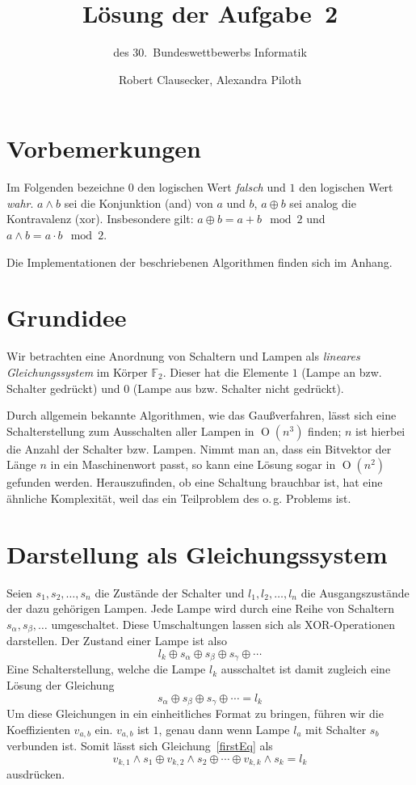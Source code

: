 \documentclass{scrartcl}
\title{Lösung der Aufgabe~2}
\subtitle{des 30.~Bundeswettbewerbs Informatik}
\author{Robert Clausecker, Alexandra Piloth}
\newcommand{\ftwo}{\ensuremath{\mathbb F_2}}
\DeclareMathOperator{\bigO}{O}
\newcommand{\xor}{\oplus}
\begin{document}
\maketitle

\section*{Vorbemerkungen}
Im Folgenden bezeichne $0$ den logischen Wert \emph{falsch} und $1$ den
logischen Wert \emph{wahr}. $a\land b$ sei die Konjunktion (and) von $a$
und $b$, $a\xor b$ sei analog die Kontravalenz (xor). Insbesondere gilt:
$a\xor b=a+b\mod 2$ und $a\land b=a\cdot b\mod 2$.

Die Implementationen der beschriebenen Algorithmen finden sich im Anhang.

\section{Grundidee}
Wir betrachten eine Anordnung von Schaltern und Lampen als \emph{lineares
Gleichungssystem} im Körper \ftwo.  Dieser hat die Elemente $1$ (Lampe an bzw.
Schalter gedrückt) und $0$ (Lampe aus bzw. Schalter nicht gedrückt).

Durch allgemein bekannte Algorithmen, wie das Gaußverfahren, lässt sich eine
Schalterstellung zum Ausschalten aller Lampen in $\bigO(n^3)$ finden; $n$ ist
hierbei die Anzahl der Schalter bzw. Lampen. Nimmt man an, dass ein Bitvektor
der Länge $n$ in ein Maschinenwort passt, so kann eine Lösung sogar in $\bigO(
n^2)$ gefunden werden. Herauszufinden, ob eine Schaltung brauchbar ist, hat eine
ähnliche Komplexität, weil das ein Teilproblem des o.\,g. Problems ist.

\section{Darstellung als Gleichungssystem}
Seien $s_1, s_2,\dots, s_n$ die Zustände der Schalter und $l_1, l_2,\dots,l_n$
die Ausgangszustände der dazu gehörigen Lampen. Jede Lampe wird durch eine Reihe
von Schaltern $s_\alpha, s_\beta,\dots$ umgeschaltet. Diese Umschaltungen lassen
sich als XOR-Operationen darstellen. Der Zustand einer Lampe ist also
\begin{equation}
l_k \xor s_\alpha \xor s_\beta \xor s_\gamma \xor \cdots
\end{equation}
Eine Schalterstellung, welche die Lampe $l_k$ ausschaltet ist damit zugleich
eine Lösung der Gleichung
\begin{equation}
s_\alpha \xor s_\beta \xor s_\gamma \xor \cdots = l_k\label{firstEq}
\end{equation}
Um diese Gleichungen in ein einheitliches Format zu bringen, führen
wir die Koeffizienten $v_{a,b}$ ein. $v_{a,b}$ ist $1$, genau dann wenn Lampe
$l_a$ mit Schalter $s_b$ verbunden ist. Somit lässt sich Gleichung~\ref{firstEq}
als
\begin{equation}
v_{k,1}\land s_1\xor v_{k,2}\land s_2\xor\cdots\xor v_{k,k}\land s_k=l_k
\end{equation}
ausdrücken.
\end{document}
